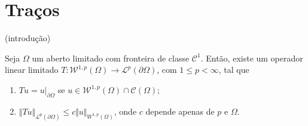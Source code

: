 \documentclass[a4paper, 11pt]{book}
\theoremstyle{definition}
\newcommand{\cC}{\mathcal{C}}
\newcommand{\cL}{\mathcal{L}}
\newcommand{\cW}{\mathcal{W}}
\begin{document}
\section{Traços}

(introdução)

\begin{tbox}
    Seja $\Omega$ um aberto limitado com fronteira de classe $\cC^1$. Então, existe um operador linear limitado $T : \cW^{1,p}(\Omega) \to \cL^p(\partial \Omega)$, com $1 \leqslant p < \infty$, tal que
    \begin{enumerate}[leftmargin=*, label=\textbf{(\alph*)}]
        \item $Tu = u \big|_{\partial \Omega}$ se $u \in \cW^{1,p}(\Omega) \cap \cC(\Omega)$;
        \item $\Vert Tu \Vert_{\cL^p(\partial\Omega)} \leqslant c \Vert u \Vert_{W^{1,p}(\Omega)}$, onde $c$ depende apenas de $p$ e $\Omega$.
    \end{enumerate}
\end{tbox} 
\end{document}
